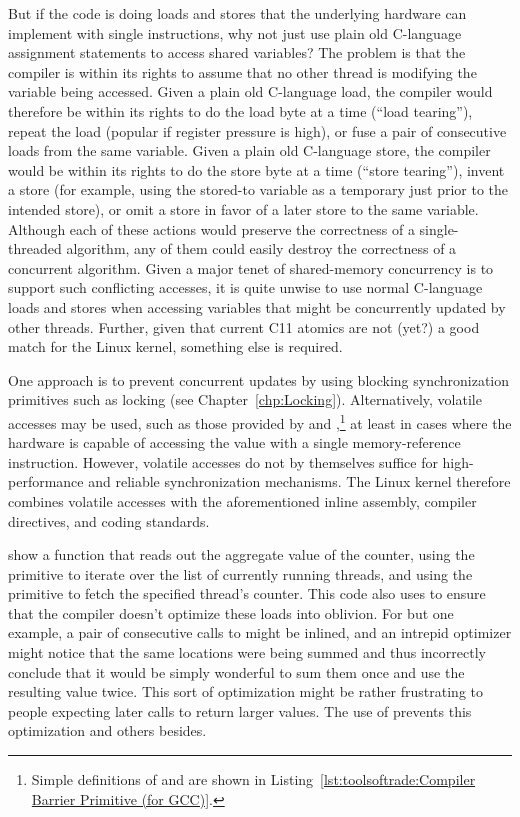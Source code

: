 \begin{lineref}
{	But if the code is doing loads and stores that the underlying
	hardware can implement with single instructions, why not just
	use plain old C-language assignment statements to access shared
	variables?
	The problem is that the compiler is within its rights to assume
	that no other thread is modifying the variable being accessed.
	Given a plain old C-language load, the compiler would therefore
	be within its rights to do the load byte at a time
	(``load tearing''), repeat the load (popular if register
	pressure is high), or fuse a pair of consecutive loads from
	the same variable.
	Given a plain old C-language store, the compiler would be within
	its rights to do the store byte at a time (``store tearing''),
	invent a store (for example, using the stored-to variable as
	a temporary just prior to the intended store), or omit a store
	in favor of a later store to the same variable.
	Although each of these actions would preserve the correctness
	of a single-threaded algorithm, any of them could easily destroy
	the correctness of a concurrent algorithm.
	Given a major tenet of shared-memory concurrency is to support
	such conflicting accesses, it is quite unwise to use normal
	C-language loads and stores when accessing variables that might
	be concurrently updated by other threads.
	Further, given that current C11 atomics are not (yet?) a good
	match for the Linux kernel, something else is required.

	One approach is to prevent concurrent updates by using
	blocking synchronization primitives such as locking
	(see Chapter~\ref{chp:Locking}).
	Alternatively, volatile accesses may be used, such as those provided
	by  and ,\footnote{
		Simple definitions of  and
		 are shown in
		Listing~\ref{lst:toolsoftrade:Compiler Barrier Primitive (for GCC)}.}
	at least in cases where the hardware is capable of accessing
	the value with a single memory-reference instruction.
	However, volatile accesses do not by themselves suffice for
	high-performance and reliable synchronization mechanisms.
	The Linux kernel therefore combines volatile accesses with
	the aforementioned inline assembly, compiler directives, and
	coding standards.
} \QuickQuizEnd

show a function that reads out the aggregate value of the counter,
using the  primitive to iterate over the list of
currently running threads, and using the  primitive
to fetch the specified thread's counter.
This code also uses  to ensure that the compiler doesn't
optimize these loads into oblivion.
For but one example, a pair of consecutive calls to 
might be inlined, and an intrepid optimizer might notice that the same
locations were being summed and thus incorrectly conclude that it would
be simply wonderful to sum them once and use the resulting value twice.
This sort of optimization might be rather frustrating to people expecting
later  calls to return larger values.
The use of  prevents this optimization and others besides.
\end{lineref}

